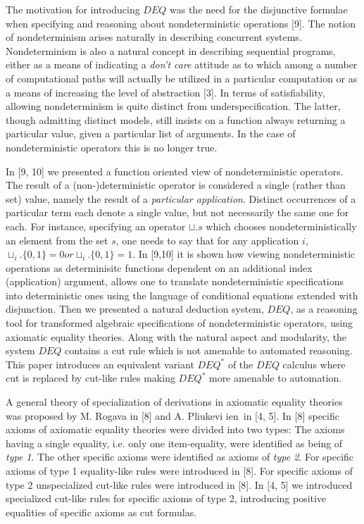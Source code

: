 
The motivation for introducing $DEQ$ was the need for the disjunctive
formulae when specifying and reasoning about nondeterministic
operations [9].
The notion of nondeterminism arises naturally in describing concurrent
systems. Nondeterminism is also a natural concept in describing sequential
programs, either as a means of indicating a {\it don't care} attitude as to
which among a number of computational paths will actually be utilized in a
particular computation or as a means of increasing
the level of abstraction [3]. In terms of satisfiability,
allowing nondeterminism is quite distinct from underspecification. The
latter, though admitting distinct models, still insists on a function always
returning a particular value, given a particular list of arguments. In the
case of nondeterministic operators this is no longer true.

In [9, 10] we presented a function oriented view of nondeterministic
operators.  The result of a (non-)deterministic operator is considered a
single (rather than set) value, namely the result of a {\it particular
application}. Distinct occurrences of a particular term each denote a
single value, but not necessarily the same one for each. For instance,
specifying an operator $\sqcup.s$ which chooses 
nondeterministically an element from the set $s$, one needs to say
that for any application $i$, $\sqcup_i.\{0,1\}=0  or
\sqcup_i.\{0,1\}=1$. In [9,10] it is shown how viewing
nondeterministic operations as determinisitc functions dependent on an
additional index (application) argument, allows one to translate
nondeterministic specifications into deterministic ones using
the language of conditional equations extended with disjunction.
Then we presented a natural deduction system, $DEQ$, as a
reasoning tool for transformed algebraic specifications of nondeterministic
operators, using axiomatic equality theories.  Along with the natural
aspect and modularity, the system $DEQ$ contains a cut rule which is not
amenable to automated reasoning. This paper introduces an equivalent
variant $DEQ^\ast$ of the $DEQ$ calculus where cut is replaced by
cut-like rules making $DEQ^\ast$ more amenable to automation.

A general theory of specialization of derivations in axiomatic
equality theories was proposed by M. Rogava in [8] and A. Pliu\s kevi\cv
ien\e \ in [4, 5]. In [8] specific axioms of axiomatic equality
theories were divided into two types: The axioms having a single
equality, i.e. only one item-equality, were identified as being of
{\it type 1}. The other specific axioms were identified as axioms
of {\it type 2}.  For specific axioms of type 1 equality-like rules
were introduced in [8].  For specific axioms of type 2 unspecialized
cut-like rules were introduced in [8]. In [4, 5] we introduced
specialized cut-like rules for specific axioms of type 2, introducing
positive equalities of specific axioms as cut formulas.

